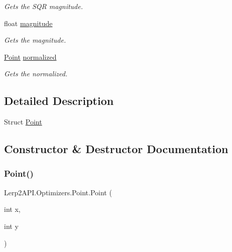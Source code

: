 \begin{DoxyCompactItemize}
\begin{DoxyCompactList}\small\item\em Gets the S\+QR magnitude. \end{DoxyCompactList}\item 
float \hyperlink{struct_lerp2_a_p_i_1_1_optimizers_1_1_point_a3ec2985e89e5bbc696238e38edccddff}{magnitude}
\begin{DoxyCompactList}\small\item\em Gets the magnitude. \end{DoxyCompactList}\item 
\hyperlink{struct_lerp2_a_p_i_1_1_optimizers_1_1_point}{Point} \hyperlink{struct_lerp2_a_p_i_1_1_optimizers_1_1_point_a983cf4bffb81f75288c690d0a1245810}{normalized}
\begin{DoxyCompactList}\small\item\em Gets the normalized. \end{DoxyCompactList}\end{DoxyCompactItemize}


\subsection{Detailed Description}
Struct \hyperlink{struct_lerp2_a_p_i_1_1_optimizers_1_1_point}{Point} 



\subsection{Constructor \& Destructor Documentation}
\mbox{\label{struct_lerp2_a_p_i_1_1_optimizers_1_1_point_acbc8b93890fbb765ae1d9cab6027068e}} 
\subsubsection{\texorpdfstring{Point()}{Point()}}
{\footnotesize\ttfamily Lerp2\+A\+P\+I.\+Optimizers.\+Point.\+Point (\begin{DoxyParamCaption}\item[{int}]{x,  }\item[{int}]{y }\end{DoxyParamCaption})\hspace{0.3cm}{\ttfamily [inline]}}




